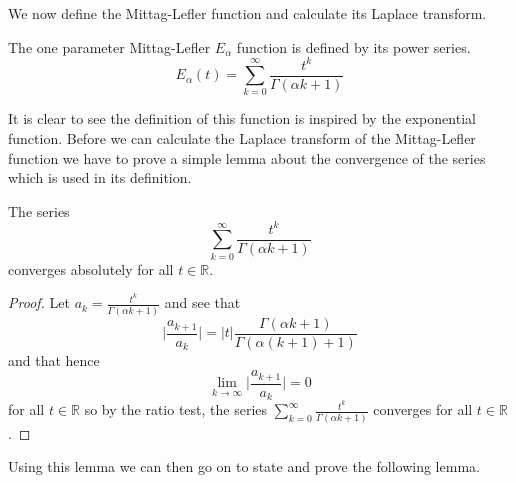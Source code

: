\documentclass{unswmaths}
\begin{document}
We now define the Mittag-Lefler function and calculate its Laplace transform.

\begin{definition}
	The one parameter Mittag-Lefler $ E_\alpha $ function is defined by its power series.
	$$
		E_\alpha(t) = \sum_{k=0}^{\infty} \frac{t^k}{\Gamma(\alpha k + 1)}
	$$
\end{definition}
It is clear to see the definition of this function is inspired by the exponential function. Before we can calculate the 
Laplace transform of the Mittag-Lefler function we have to prove a simple lemma about the convergence of the 
series which is used in its definition.

\begin{lemma}
\label{lem:mit_conv}

	The series
	$$
		\sum_{k=0}^{\infty} \frac{t^k}{\Gamma(\alpha k + 1)} 
	$$
  	converges absolutely for all $ t \in \mathbb{R} $.
\end{lemma}
\begin{proof}
	Let $ a_k = \frac{t^k}{\Gamma(\alpha k + 1) }$ and see that
	$$ \lvert \frac{a_{k+1}}{a_k} \rvert = |t| \frac{\Gamma(\alpha k + 1) }{\Gamma(\alpha(k+1) + 1)} $$
	and that hence 
	$$
		\lim_{k \longrightarrow \infty} \lvert \frac{a_{k+1}}{a_k} \rvert = 0
	$$
	for all $ t \in \mathbb{R} $ so by the ratio test, the series $ \sum_{k=0}^{\infty} \frac{t^k}{\Gamma(\alpha k + 1)}  $
	converges for all $ t \in \mathbb{R} $.
\end{proof}

Using this lemma we can then go on to state and prove the following lemma.
\end{document}
